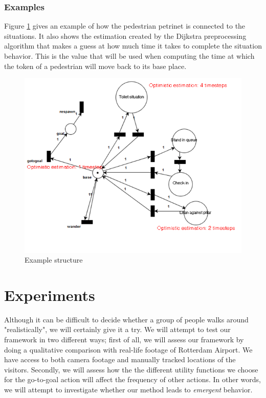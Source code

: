 \documentclass[11pt]{book}
\begin{document}
\subsection{Examples}
Figure \ref{petrinetexample} gives an example of how the pedestrian petrinet is connected to the situations. It also shows the estimation created by the Dijkstra preprocessing algorithm that makes a guess at how much time it takes to complete the situation behavior. This is the value that will be used when computing the time at which the token of a pedestrian will move back to its base place.

\begin{figure}
\centering
\includegraphics[width=350pt]{example}
\caption{Example structure}
\label{petrinetexample}
\end{figure}





\chapter{Experiments}
\label{chap:experiments}
Although it can be difficult to decide whether a group of people walks around "realistically", we will certainly give it a try. We will attempt to test our framework in two different ways; first of all, we will assess our framework by doing a qualitative comparison with real-life footage of Rotterdam Airport. We have access to both camera footage and manually tracked locations of the visitors.
Secondly, we will assess how the the different utility functions we choose for the go-to-goal action will affect the frequency of other actions. In other words, we will attempt to investigate whether our method leads to \emph{emergent} behavior.
\end{document}
